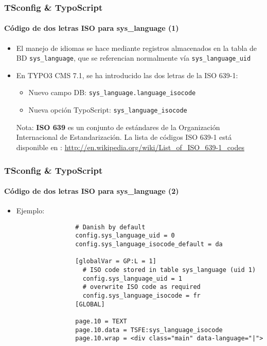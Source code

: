 \begin{frame}[fragile]
	\frametitle{TSconfig \& TypoScript}
	\framesubtitle{Código de dos letras ISO para sys\_language (1)}

	\begin{itemize}
		\item El manejo de idiomas se hace mediante registros almacenados en la tabla de BD
			\texttt{sys\_language}, que se referencian normalmente vía  \texttt{sys\_language\_uid}
		\item En TYPO3 CMS 7.1, se ha introducido las dos letras de la ISO 639-1:

			\begin{itemize}
				\item Nuevo campo DB: \texttt{sys\_language.language\_isocode}
				\item Nueva opción TypoScript: \texttt{sys\_language\_isocode}
			\end{itemize}


		\vspace{1cm}

		\small
			Nota: \textbf{ISO 639} es un conjunto de estándares de la Organización Internacional de Estandarización. La lista de códigos ISO 639-1 está disponible en :\newline
			\url{http://en.wikipedia.org/wiki/List_of_ISO_639-1_codes}
		\normalsize

	\end{itemize}

\end{frame}


\begin{frame}[fragile]
	\frametitle{TSconfig \& TypoScript}
	\framesubtitle{Código de dos letras ISO para sys\_language (2)}

	\begin{itemize}
		\item Ejemplo:

			\begin{lstlisting}
				# Danish by default
				config.sys_language_uid = 0
				config.sys_language_isocode_default = da

				[globalVar = GP:L = 1]
				  # ISO code stored in table sys_language (uid 1)
				  config.sys_language_uid = 1
				  # overwrite ISO code as required
				  config.sys_language_isocode = fr
				[GLOBAL]

				page.10 = TEXT
				page.10.data = TSFE:sys_language_isocode
				page.10.wrap = <div class="main" data-language="|">
			\end{lstlisting}

	\end{itemize}

\end{frame}

